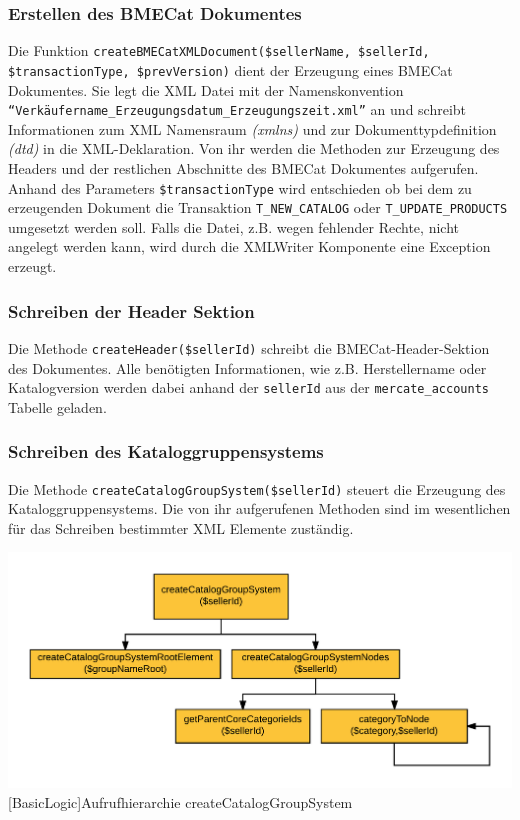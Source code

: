 	
	
	
	
	\subsubsection{Erstellen des BMECat Dokumentes}
	
	Die Funktion \texttt{createBMECatXMLDocument(\$sellerName, \$sellerId, \$transactionType, \$prevVersion)} dient der Erzeugung eines BMECat Dokumentes. Sie legt die XML Datei mit der Namenskonvention \texttt{\enquote{Verkäufername\_Erzeugungsdatum\_Erzeugungszeit.xml}} an und schreibt Informationen zum XML Namensraum \textit{(xmlns)} und zur Dokumenttypdefinition \textit{(dtd)} in die XML-Deklaration. Von ihr werden die Methoden zur Erzeugung des Headers und der restlichen Abschnitte des BMECat Dokumentes aufgerufen.
	Anhand des Parameters \texttt{\$transactionType} wird entschieden ob bei dem zu erzeugenden Dokument die Transaktion \texttt{T\_NEW\_CATALOG} oder \texttt{T\_UPDATE\_PRODUCTS} umgesetzt werden soll. Falls die Datei, z.B. wegen fehlender Rechte, nicht angelegt werden kann, wird durch die XMLWriter Komponente eine Exception erzeugt.
	
	\subsubsection{Schreiben der Header Sektion}

	Die Methode \texttt{createHeader(\$sellerId)} schreibt die BMECat-Header-Sektion des Dokumentes. Alle benötigten Informationen, wie z.B. Herstellername oder Katalogversion werden dabei anhand der \texttt{sellerId} aus der \texttt{mercate\_accounts} Tabelle geladen.
	
	\subsubsection{Schreiben des Kataloggruppensystems}
	
	Die Methode \texttt{createCatalogGroupSystem(\$sellerId)} steuert die Erzeugung des Kataloggruppensystems. Die von ihr aufgerufenen Methoden sind im wesentlichen für das Schreiben bestimmter XML Elemente zuständig.\\
	\begin{minipage}{\linewidth}
		\vspace{1em}
		\centering
		\includegraphics[width=0.7 \linewidth]{img/CreateCatalogGroupSystemHierarchie}
		[BasicLogic]{Aufrufhierarchie createCatalogGroupSystem}
		\vspace{1em}
	\end{minipage}
	
